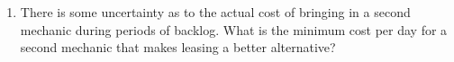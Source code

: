 \documentclass[12pt, oneside]{book}
\newenvironment{solution}{\textit{Solution.}}
\newcommand{\sol}[1]{
    \begin{customframedproof}[linecolor=orangehdx!75,]
        \begin{solution}
        #1
        \end{solution}
    \end{customframedproof}
}
\begin{document}
\begin{enumerate}
\begin{enumerate}
        \item  There is some uncertainty as to the actual cost of bringing in a second mechanic during periods of backlog. What is the minimum cost per day for a second mechanic that makes leasing a better alternative?

    \end{enumerate}
\end{enumerate}
\end{document}
